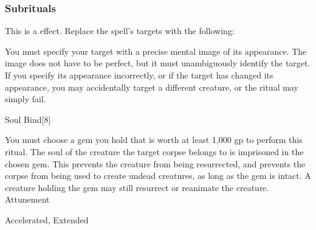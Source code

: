 \subsubsection{Subrituals}
This is a  effect.
Replace the spell's targets with the following:
\begin{spellcontent}
\begin{augmenttargetinginfo}
\spellspecial
You must specify your target with a precise mental image of its appearance.
The image does not have to be perfect, but it must unambiguously identify the target.
If you specify its appearance incorrectly, or if the target has changed its appearance, you may accidentally target a different creature, or the ritual may simply fail.
\end{augmenttargetinginfo}
\end{spellcontent}
\begin{spellsection}{Soul Bind}[8]
\begin{spellcontent}
\begin{spelltargetinginfo}
\end{spelltargetinginfo}
\begin{spelleffects}
\spellspecial
You must choose a gem you hold that is worth at least 1,000 gp to perform this ritual.
\spelleffect
The soul of the creature the target corpse belongs to is imprisoned in the chosen gem.
This prevents the creature from being resurrected, and prevents the corpse from being used to create undead creatures, as long as the gem is intact.
A creature holding the gem may still resurrect or reanimate the creature.
\spelldur Attunement
\end{spelleffects}
\end{spellcontent}
\begin{spellfooter}
 Accelerated, Extended
\end{spellfooter}
\begin{spellsubcontent}
\end{spellsubcontent}
\end{spellsection}
